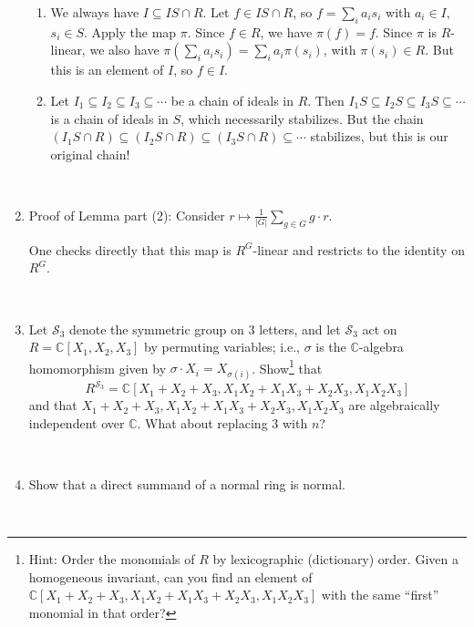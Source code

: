 \documentclass[12pt]{amsart}
\newcommand{\C}{\mathbb{C}}
\newcommand{\1}{\mathbbm{1}}
\newcommand{\solution}[1]{\ifthenelse {\equal{\displaysol}{1}} {\begin{framed}{\color{meretale}\noindent #1}\end{framed}} { \ }}
\newcommand\itemB{\stepcounter{enumi}\item[(\theenumi)]}
\begin{document}
\begin{enumerate}
\solution{
\begin{enumerate}
\item We always have $I \subseteq IS \cap R$. Let $f\in IS \cap R$, so $f=\sum_i a_i s_i$ with $a_i\in I$, $s_i\in S$. Apply the map $\pi$. Since $f\in R$, we have $\pi(f)=f$. Since $\pi$ is $R$-linear, we also have $\pi\left( \sum_i a_i s_i\right) = \sum_i a_i \pi(s_i)$, with $\pi(s_i)\in R$. But this is an element of $I$, so $f\in I$.
\item Let $I_1 \subseteq I_2 \subseteq I_3 \subseteq \cdots$ be a chain of ideals in $R$. Then $I_1 S \subseteq I_2 S \subseteq I_3 S \subseteq \cdots$ is a chain of ideals in $S$, which necessarily stabilizes. But the chain $(I_1 S \cap R) \subseteq (I_2 S \cap R) \subseteq (I_3 S \cap R) \subseteq \cdots$ stabilizes, but this is our original chain!
\end{enumerate}
}

\itemB Proof of Lemma part (2): Consider $r \mapsto \frac{1}{|G|} \sum_{g\in G} g\cdot r$.

\solution{One checks directly that this map is $R^G$-linear and restricts to the identity on $R^G$.}

\itemB Let $\mathcal{S}_3$ denote the symmetric group on $3$ letters, and let $\mathcal{S}_3$ act on $R=\C[X_1,X_2,X_3]$ by permuting variables; i.e., $\sigma$ is the $\C$-algebra homomorphism given by $\sigma \cdot X_i= X_{\sigma(i)}$. Show\footnote{Hint: Order the monomials of $R$ by lexicographic (dictionary) order. Given a homogeneous invariant, can you find an element of $\C[X_1+X_2+X_3,X_1X_2+X_1X_3+X_2X_3,X_1X_2X_3]$ with the same ``first'' monomial in that order?} that
\[R^{\mathcal{S}_3} = \C[X_1+X_2+X_3,X_1X_2+X_1X_3+X_2X_3,X_1X_2X_3]\]
and that $X_1+X_2+X_3,X_1X_2+X_1X_3+X_2X_3,X_1X_2X_3$ are algebraically independent over $\C$. What about replacing $3$ with $n$?

\solution{}

\itemB Show that a direct summand of a normal ring is normal.

\solution{}


\end{enumerate}



\vfill
\end{document}
